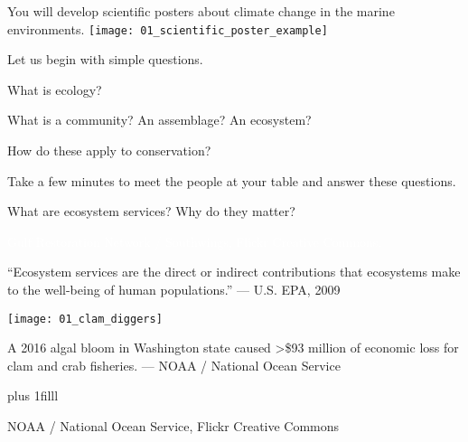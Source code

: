 \documentclass[t]{beamer}
\begin{document}
{
\begin{frame}
\end{frame}
}


\begin{frame}{You will develop scientific posters about climate change in the marine environments.}
		\texttt{[image: 01\_scientific\_poster\_example]}
\end{frame}

{
\begin{frame}
\end{frame}
}

\begin{frame}[t]{Let us begin with simple questions.}

	\hangpara What is ecology?
	
	\hangpara What is a community? An assemblage? An ecosystem?

	\hangpara How do these apply to conservation?

	\hangpara Take a few minutes to meet the people at your table and answer these questions.

\end{frame}

{
\begin{frame}[b]{What are ecosystem services? Why do they matter?}
	
\tiny\hfill\textcolor{white}{Gulf Restoration Network / Southwings, Flickr Creative Commons.}

\end{frame}
}


\begin{frame}[t]
	
	“Ecosystem services are the direct or indirect contributions that ecosystems make to the well-being of human populations.” — U.S. EPA, 2009 \vspace*{\baselineskip}
	
	\texttt{[image: 01\_clam\_diggers]}
	
	A 2016 algal bloom in Washington state caused \textgreater \$93 million of economic loss for clam and crab fisheries. --- NOAA / National Ocean Service
	
	\vskip0pt plus 1filll
	
	\hfill\tiny NOAA / National Ocean Service, Flickr Creative Commons
	
\end{frame}
\end{document}
